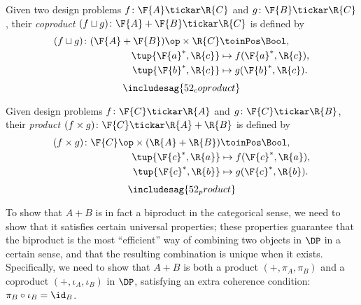 \begin{definition}
\label{define:coproduct}
Given two design problems $f\colon \F{A} \tickar \R{C}$ and $g \colon \F{B} \tickar \R{C}$, their \emph{coproduct} $(f \sqcup g)\colon \F{A} + \F{B} \tickar \R{C}$ is defined by
\begin{equation}
\begin{aligned}
    (f \sqcup g) \colon (\F{A} + \F{B})\op \times \R{C} & \toinPos \Bool,  \\
            \tup{ \F{a}^*, \R{c}} & \mapsto f(\F{a}^*, \R{c}), \\
            \tup{ \F{b}^*, \R{c}} & \mapsto g(\F{b}^*, \R{c}).
\end{aligned}
\end{equation}
\begin{equation}
    \includesag{52_coproduct}
\end{equation}
\end{definition}

\begin{definition}
\label{define:product}
Given design problems $f\colon \F{C} \tickar \R{A}$ and $g \colon \F{C} \tickar \R{B}$, their \emph{product} $(f \times g)\colon \F{C} \tickar \R{A} + \R{B}$ is defined by
\begin{equation}
\begin{aligned}
    (f \times g) \colon \F{C}\op  \times (\R{A} + \R{B}) & \toinPos \Bool,  \\
            \tup{\F{c}^*, \R{a}} & \mapsto f(\F{c}^*, \R{a}), \\
            \tup{\F{c}^*, \R{b}} & \mapsto g(\F{c}^*, \R{b}).
\end{aligned}
\end{equation}
\begin{equation}
    \includesag{52_product}
\end{equation}
\end{definition}


To show that $A + B$ is in fact a biproduct in the categorical sense, we need to show that it satisfies certain universal properties; these properties guarantee that the biproduct is the most ``efficient'' way of combining two objects in $\DP$ in a certain sense, and that the resulting combination is unique when it exists. Specifically, we need to show that $A + B$ is both a product $(+, \pi_A, \pi_B)$ and a coproduct $(+, \iota_A, \iota_B)$ in $\DP$, satisfying an extra coherence condition: $\pi_B \circ \iota_B = \id_B$.

